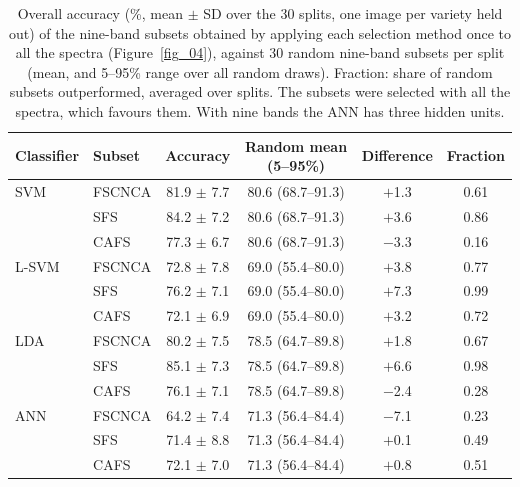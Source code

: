 \documentclass[final,5p,times,twocolumn]{elsarticle}
\newcommand{\added}[1]{{\color{blue}#1}}
\begin{document}
\begin{table}[htbp!]
    \centering
    \caption{\added{Overall accuracy (\%, mean $\pm$ SD over the 30 splits, one image per variety held out) of the nine-band subsets obtained by applying each selection method once to all the spectra (Figure~\ref{fig_04}), against 30 random nine-band subsets per split (mean, and 5--95\% range over all random draws). Fraction: share of random subsets outperformed, averaged over splits. The subsets were selected with all the spectra, which favours them. With nine bands the ANN has three hidden units.}}
    \label{tab:sub9}
    \begin{tabular}{llcccc}
    \hline
    Classifier & Subset & Accuracy & Random mean (5--95\%) & Difference & Fraction \\
    \hline
    SVM   & FSCNCA & 81.9 $\pm$ 7.7 & 80.6 (68.7--91.3) & $+$1.3 & 0.61 \\
          & SFS    & 84.2 $\pm$ 7.2 & 80.6 (68.7--91.3) & $+$3.6 & 0.86 \\
          & CAFS   & 77.3 $\pm$ 6.7 & 80.6 (68.7--91.3) & $-$3.3 & 0.16 \\
    L-SVM & FSCNCA & 72.8 $\pm$ 7.8 & 69.0 (55.4--80.0) & $+$3.8 & 0.77 \\
          & SFS    & 76.2 $\pm$ 7.1 & 69.0 (55.4--80.0) & $+$7.3 & 0.99 \\
          & CAFS   & 72.1 $\pm$ 6.9 & 69.0 (55.4--80.0) & $+$3.2 & 0.72 \\
    LDA   & FSCNCA & 80.2 $\pm$ 7.5 & 78.5 (64.7--89.8) & $+$1.8 & 0.67 \\
          & SFS    & 85.1 $\pm$ 7.3 & 78.5 (64.7--89.8) & $+$6.6 & 0.98 \\
          & CAFS   & 76.1 $\pm$ 7.1 & 78.5 (64.7--89.8) & $-$2.4 & 0.28 \\
    ANN   & FSCNCA & 64.2 $\pm$ 7.4 & 71.3 (56.4--84.4) & $-$7.1 & 0.23 \\
          & SFS    & 71.4 $\pm$ 8.8 & 71.3 (56.4--84.4) & $+$0.1 & 0.49 \\
          & CAFS   & 72.1 $\pm$ 7.0 & 71.3 (56.4--84.4) & $+$0.8 & 0.51 \\
    \hline
    \end{tabular}
\end{table}
\end{document}
